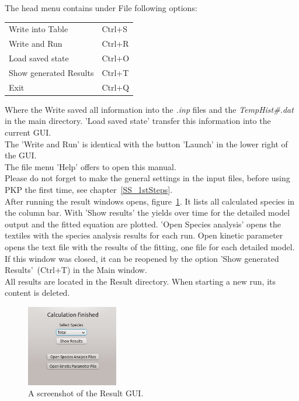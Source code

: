 The head menu contains under File following options:
\begin{center}
\begin{tabular}{ll}
Write into Table & Ctrl+S\\
Write and Run & Ctrl+R\\
Load saved state & Ctrl+O\\
Show generated Results & Ctrl+T\\
Exit & Ctrl+Q\\
\end{tabular}
\end{center}
Where the Write saved all information into the \emph{.inp} files and the \emph{TempHist\#.dat} in the main directory. 'Load saved state' transfer this information into the current GUI.\\
The 'Write and Run' is identical with the button 'Launch' in the lower right of the GUI.\\
The file menu 'Help' offers to open this manual.\\

Please do not forget to make the general settings in the input files, before using PKP the first time, see chapter~\ref{SS_1stSteps}.\\

After running the result windows opens, figure~\ref{F_GUIDone}. It lists all calculated species in the column bar. With 'Show results' the yields over time for the detailed model output and the fitted equation are plotted. 'Open Species analysis' opens the textiles with the species analysis results for each run. Open kinetic parameter opens the text file with the results of the fitting, one file for each detailed model. If this window was closed, it can be reopened by the option 'Show generated Results'~(Ctrl+T) in the Main window. \\
All results are located in the Result directory. When starting a new run, its content is deleted.\\

\begin{figure}
\centering
\includegraphics[width=4cm,angle=0]{Figures/GUI_Done}
\caption{A screenshot of the Result GUI.}
\label{F_GUIDone}
\end{figure}

